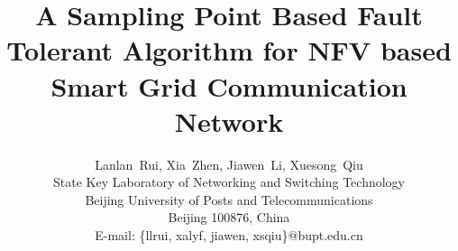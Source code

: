 \documentclass[journal]{IEEEtran}
\begin{document}
%
\title{A Sampling Point Based Fault Tolerant Algorithm for NFV based Smart Grid Communication Network}
%
%
%

\author{
Lanlan~Rui, Xia~Zhen, Jiawen~Li, Xuesong~Qiu\\
State Key Laboratory of Networking and Switching Technology\\
Beijing University of Posts and Telecommunications\\
Beijing 100876, China\\
E-mail: \{llrui, xalyf, jiawen, xsqiu\}@bupt.edu.cn\\
}

% 
%




% 
\end{document}
